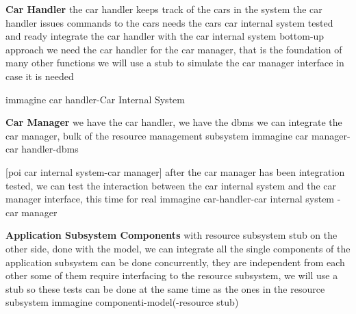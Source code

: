 \documentclass[english]{article}
\begin{document}
\textbf{Car Handler}
the car handler keeps track of the cars in the system
the car handler issues commands to the cars
needs the cars
car internal system tested and ready
integrate the car handler with the car internal system
bottom-up approach
we need the car handler for the car manager, that is the foundation of many other functions
we will use a stub to simulate the car manager interface in case it is needed

immagine car handler-Car Internal System
\begin{figure}[H]
	\centering
\end{figure}

\textbf{Car Manager}
we have the car handler, we have the dbms
we can integrate the car manager, bulk of the resource management subsystem
immagine car manager-car handler-dbms
\begin{figure}[H]
	\centering
\end{figure}

[poi car internal system-car manager]
after the car manager has been integration tested, we can test the interaction between the car internal system and the car manager interface, this time for real
immagine car-handler-car internal system -car manager
\begin{figure}[H]
	\centering
\end{figure}

\textbf{Application Subsystem Components}
with resource subsystem stub
on the other side, done with the model, we can integrate all the single components of the application subsystem
can be done concurrently, they are independent from each other
some of them require interfacing to the resource subsystem, we will use a stub so these tests can be done at the same time as the ones in the resource subsystem
immagine componenti-model(-resource stub)
\end{document}

